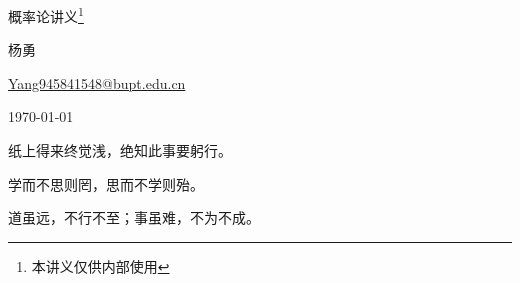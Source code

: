 \documentclass[10pt,UTF8]{ctexbook}
\newcommand{\hei}{\heiti}
\newcommand{\kai}{\kaishu}
\newcommand{\BWKai}{\kai}
\theoremstyle{plain}
\numberwithin{equation}{chapter}
\numberwithin{algorithm}{chapter}
\begin{document}
\frontmatter
\begin{titlepage}\Large
\renewcommand{\thefootnote}{\fnsymbol{footnote}}
  \begin{center}
  \vspace*{3cm}
  {\hei\Huge 概率论讲义\footnote{本讲义仅供内部使用}} \bigskip

  {\hei\LARGE 杨勇} \medskip

  \url{Yang945841548@bupt.edu.cn}\medskip

  \today

  \end{center}
\end{titlepage}

\begin{center}\LARGE
  \vspace*{0.3\textheight}

  {\BWKai\color{blue}
    纸上得来终觉浅，绝知此事要躬行。\bigskip\bigskip

    学而不思则罔，思而不学则殆。\bigskip\bigskip

    道虽远，不行不至；事虽难，不为不成。
  }
\end{center}

\clearpage
{}
\tableofcontents

\mainmatter



\clearpage{\pagestyle{empty}\cleardoublepage}
%


%
%
%

\backmatter
{}

\end{document}
